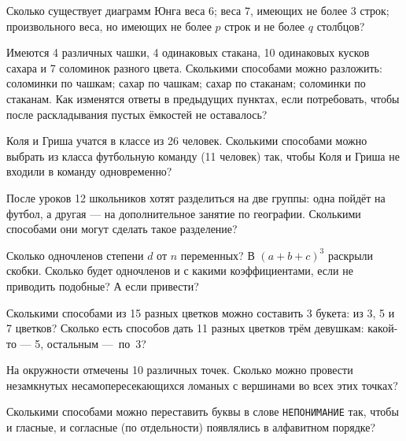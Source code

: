 \documentclass[12pt,a4paper]{article}
\begin{document}
Сколько существует диаграмм Юнга\quad
{}
  веса 6;\quad
{} веса 7, имеющих не более 3 строк;\\
 произвольного веса, но имеющих не более $p$ строк и не более $q$
 столбцов?

Имеются 4 различных чашки,
4 одинаковых стакана,
10 одинаковых кусков сахара
и 7 соломинок разного цвета.
Сколькими способами можно разложить:
 соломинки по чашкам;
 сахар по чашкам;
 сахар по стаканам;
 соломинки по стаканам.
  Как изменятся ответы в предыдущих пунктах, если потребовать,
чтобы после раскладывания пустых ёмкостей не оставалось?


\vspace*{-1mm}

\vspace*{-1mm}
Коля и Гриша учатся в классе из 26 человек. Сколькими способами
можно выбрать из класса футбольную команду (11 человек) так, чтобы
Коля и Гриша не входили в команду одновременно?

После уроков 12 школьников хотят разделиться на две группы: одна пойдёт на футбол, а другая --- на дополнительное занятие по географии.
Сколькими способами они могут сделать такое разделение?

 Сколько одночленов степени $d$ от $n$ переменных?
 В $(a+b+c)^3$ раскрыли скобки. Сколько будет одночленов и с какими коэффициентами, если не приводить подобные?
А если привести?

  Сколькими способами из 15 разных цветков можно составить
3 букета: из 3, 5 и 7 цветков?
 Сколько есть способов дать 11 разных цветков трём девушкам: какой-то --- 5, остальным ---~по~3?

На окружности отмечены 10 различных точек. Сколько можно провести незамкнутых
несамопересекающихся ломаных с вершинами во всех этих точках?


Сколькими способами можно переставить буквы в слове \texttt{НЕПОНИМАНИЕ} так, чтобы и гласные, и согласные (по отдельности) появлялись в алфавитном порядке?
\end{document}

